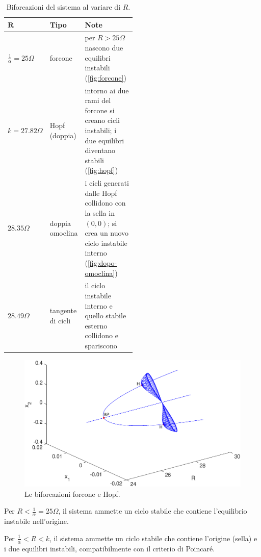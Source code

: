 \begin{enumerate}
\begin{table}
    \centering
    \begin{tabular}{l l p{0.5\linewidth}}
        $\mathbf{R}$ & \textbf{Tipo} & \textbf{Note}\\
        \hline
        $\frac{1}{\alpha} = 25 \Omega$ & forcone & per $R>25 \Omega$ nascono due equilibri instabili (\autoref{fig:forcone}) \\
        \hline
        $k=27.82 \Omega$ & Hopf (doppia) & intorno ai due rami del forcone si creano cicli instabili; i due equilibri diventano stabili (\autoref{fig:hopf}) \\
        \hline
        $28.35 \Omega$ & doppia omoclina & i cicli generati dalle Hopf collidono con la sella in $(0,0)$; si crea un nuovo ciclo instabile interno (\autoref{fig:dopo-omoclina}) \\
        \hline
        $28.49 \Omega$ & tangente di cicli & il ciclo instabile interno e quello stabile esterno collidono e spariscono \\
        \hline
    \end{tabular}
    \caption{Biforcazioni del sistema al variare di $R$.}
    \label{tab:biforc-r}
\end{table}

\begin{figure}
    \centering
    \includegraphics[width=1\textwidth]{matcont/ForconeHopf}
    \caption{Le biforcazioni forcone e Hopf.}
    \label{fig:forcone}
\end{figure}

Per $R<\frac{1}{\alpha}=25 \Omega$, il sistema ammette un ciclo stabile che contiene l'equilibrio instabile nell'origine.

Per $\frac{1}{\alpha} < R < k$, il sistema ammette un ciclo stabile che contiene l'origine (sella) e i due equilibri instabili, compatibilmente con il criterio di Poincaré.


\end{enumerate}
